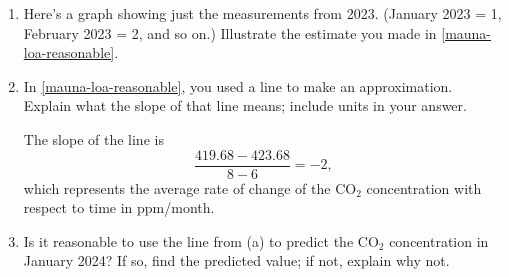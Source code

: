 \documentclass{article}
\begin{document}
\begin{enumerate}
\begin{enumerate}
  \item


    \begin{problem}
      Here's a graph showing just the measurements from 2023. (January 2023 = 1, February 2023 = 2, and so on.) Illustrate the estimate you made in \ref{mauna-loa-reasonable}.

    \end{problem}

  \item


    \begin{problem}[\vfill]
      In \ref{mauna-loa-reasonable}, you used a line to make an approximation. Explain what the slope of that line means; include units in your answer.
    \end{problem}

    \begin{solution}
      The slope of the line is
      \[\frac{419.68 - 423.68}{8-6} = -2,\]
      which represents the average rate of change of the CO$_2$ concentration with respect to time in ppm/month.
    \end{solution}

  \item 
    \begin{problem}[\vfill]
      Is it reasonable to use the line from (a) to predict the CO$_2$ concentration in January 2024? If so, find the predicted value; if not, explain why not.
    \end{problem}


\end{enumerate}
\end{enumerate}
\end{document}
